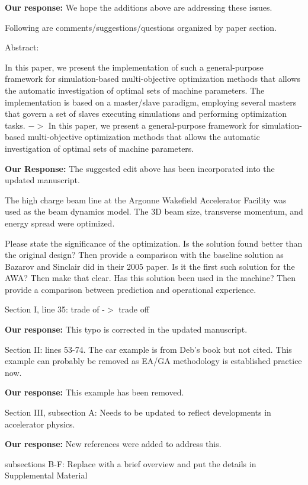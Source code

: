 \documentclass{article}
\begin{document}
{\bf Our response:}{\color{blue} 	
	We hope the additions above are addressing these issues. }

Following are comments/suggestions/questions organized by paper
section.

Abstract:

In this paper, we present the implementation of such a general-purpose
framework for simulation-based multi-objective optimization methods
that allows the automatic investigation of optimal sets of machine
parameters. The implementation is based on a master/slave paradigm,
employing several masters that govern a set of slaves executing
simulations and performing optimization tasks. $->$ In this paper, we
present a general-purpose framework for simulation-based
multi-objective optimization methods that allows the automatic
investigation of optimal sets of machine parameters.

{\bf Our Response:} {\color{blue} The suggested edit above has been incorporated into the updated manuscript. }

The high charge beam line at the Argonne Wakefield Accelerator
Facility was used as the beam dynamics model. The 3D beam size,
transverse momentum, and energy spread were optimized. 

Please state
the significance of the optimization. Is the solution found better
than the original design? Then provide a comparison with the baseline
solution as Bazarov and Sinclair did in their 2005 paper. Is it the
first such solution for the AWA? Then make that clear. Has this
solution been used in the machine? Then provide a comparison between
prediction and operational experience.

Section I, line 35: trade of -$>$ trade off

{\bf Our response:} {\color{blue} This typo is corrected in the updated manuscript.}

Section II:
lines 53-74. The car example is from Deb’s book but not cited. This
example can probably be removed as EA/GA methodology is established
practice now.

{\bf Our response:} {\color{blue} This example has been removed.}

Section III, subsection A:
Needs to be updated to reflect developments in accelerator physics.

{\bf Our response:} {\color{blue} New references were added to address this.}

subsections B-F:
Replace with a brief overview and put the details in Supplemental
Material
\end{document}

